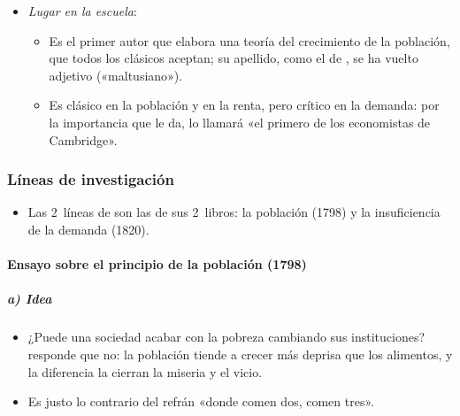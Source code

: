 \documentclass[11pt]{article}
\begin{document}
\begin{itemize}
\begin{itemize}
  \end{itemize}
\item \emph{Lugar en la escuela}:
  \begin{itemize}
  \item Es el primer autor que elabora una teoría del crecimiento de la población, que todos los clásicos aceptan; su apellido, como el de , se ha vuelto adjetivo («maltusiano»).
  \item Es clásico en la población y en la renta, pero crítico en la demanda: por la importancia que le da,  lo llamará «el primero de los economistas de Cambridge»\nocite{Keynes1933Essays}.
  \end{itemize}
\end{itemize}

\subsubsection{Líneas de investigación}\label{sec:malthus-lineas}

\begin{itemize}
\item Las 2~líneas de  son las de sus 2~libros: la población (1798) y la insuficiencia de la demanda (1820).
\end{itemize}

\paragraph{Ensayo sobre el principio de la población (1798)}\label{sec:malthus-poblacion}

\subparagraph{a) Idea}
\begin{itemize}
\item ¿Puede una sociedad acabar con la pobreza cambiando sus instituciones?  responde que no: la población tiende a crecer más deprisa que los alimentos, y la diferencia la cierran la miseria y el vicio.
\item Es justo lo contrario del refrán «donde comen dos, comen tres».
\end{itemize}
\end{document}

